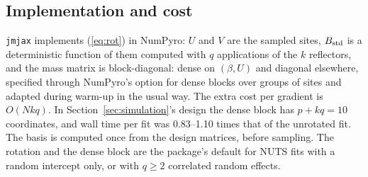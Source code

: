 \subsection{Implementation and cost}

\texttt{jmjax} implements (\ref{eq:rot}) in NumPyro: $U$ and $V$ are the
sampled sites, $B_{\mathrm{std}}$ is a deterministic function of them computed with
$q$ applications of the $k$ reflectors, and the mass matrix is
block-diagonal: dense on $(\beta, U)$ and diagonal elsewhere, specified
through NumPyro's option for dense blocks over groups of sites and adapted
during warm-up in the usual way. The extra cost per gradient is $O(Nkq)$. In Section~\ref{sec:simulation}'s
design the dense block has $p + kq = 10$ coordinates, and wall time per
fit was 0.83--1.10 times that of the unrotated fit. The basis is computed
once from the design matrices, before sampling. The rotation and the
dense block are the package's default for NUTS fits with a random
intercept only, or with $q \geq 2$ correlated random effects.
